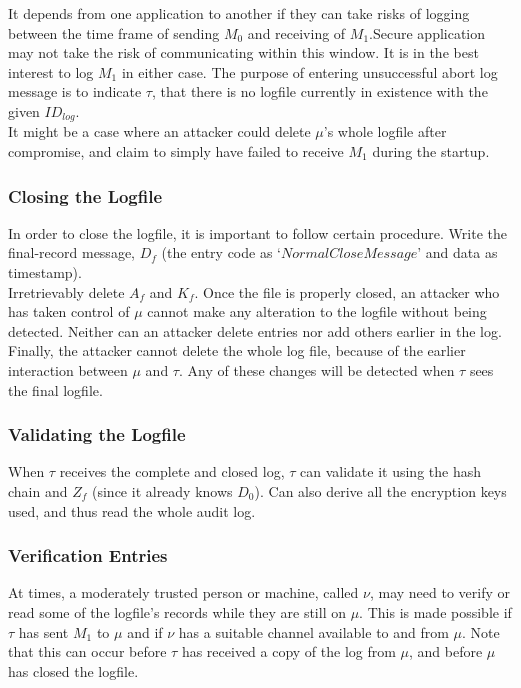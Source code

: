 \documentclass[12pt, letter]{article}
\begin{document}
It depends from one application to another if they can take risks of logging between the time frame of sending $M_0$ and receiving of $M_1$.Secure application may not take the risk of communicating within this window. It is in the best interest to log $M_1$ in either case. The purpose of entering unsuccessful abort log message is to indicate $\tau$, that there is no logfile currently in existence with the given $ID_{log}$.\\

It might be a case where an attacker could delete $\mu$'s whole logfile after compromise, and claim to simply have failed to receive $M_1$ during the startup.

\subsubsection{Closing the Logfile}

In order to close the logfile, it is important to follow certain procedure. Write the final-record message, $D_f$ (the entry code as `$NormalCloseMessage$' and data as timestamp).\\

Irretrievably delete $A_f$ and $K_f$. Once the file is properly closed, an attacker who has taken control of $\mu$ cannot make any alteration to the logfile without being detected. Neither can an attacker delete entries nor add others earlier in the log. Finally, the attacker cannot delete the whole log file, because of the earlier interaction between $\mu$ and $\tau$. Any of these changes will be detected when $\tau$ sees the final logfile.

\subsubsection{Validating the Logfile}
When $\tau$ receives the complete and closed log, $\tau$ can validate it using the hash chain and $Z_f$ (since it already knows $D_0$). Can also derive all the encryption keys used, and thus read the whole audit log.

\subsubsection{Verification Entries}

At times, a moderately trusted person or machine, called $\nu$, may need to verify or read some of the logfile’s records while they are still on $\mu$. This is made possible if $\tau$ has sent $M_1$ to $\mu$ and if $\nu$ has a suitable channel available to and from $\mu$. Note that this can occur before $\tau$ has received a copy of the log from $\mu$, and before $\mu$ has closed the logfile.
\end{document}
